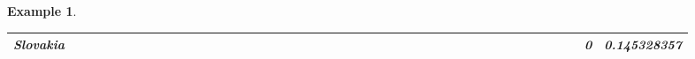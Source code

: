 \documentclass[a4paper,11pt]{report}
\newtheorem{example}[theorem]{Example}
\begin{document}
\begin{example}
\begin{appendices}
\begin{landscape}
\begin{longtable}{r|r|r|r|r|r|r|r|r|r|r|r|r|r|r|r|r|r|r|r|r|r|r|r|r|r|r|r|r|r|r|r|r|r|r|r|r|r|r|r|r|r|r|r|}
\multicolumn{1}{|r|}{\textbf{Slovakia}}              &                                       &                                       &                                          &                                       &                                       &                                                     &                                        &                                       &                                      &                                       &                                       &                                                &                                       &                                      &                                       &                                       &                                      &                                       &                                       &                                      &                                      &                                         &                                     &                                       &                                      &                                      &                                        &                                       &                                      &                                      &                                        &                                        &                                     &                                      &                                           &                                               &                                      &                                       &                                              &                                      &                                     & 0                                             & 0.145328357                             \\ \hline

\end{longtable}
\end{landscape}
\end{appendices}
\end{example}
\end{document}
